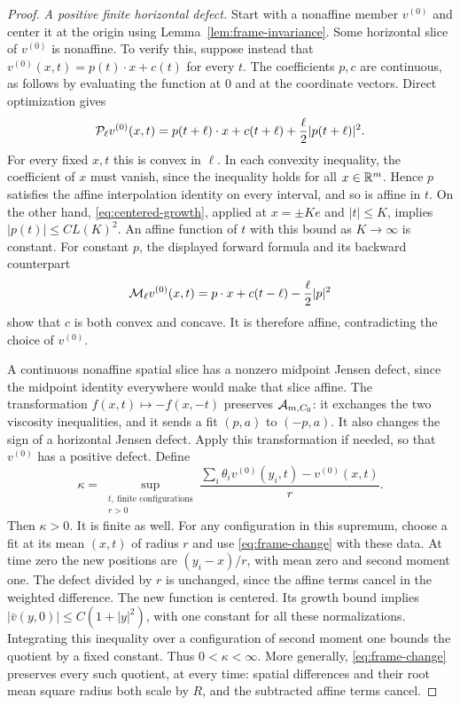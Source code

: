 \begin{proof}
\emph{A positive finite horizontal defect.}
Start with a nonaffine member $v^{(0)}$ and center it at the
origin using Lemma~\ref{lem:frame-invariance}. Some horizontal
slice of $v^{(0)}$ is nonaffine. To verify this, suppose instead
that
$v^{(0)}(x,t)=p(t)\cdot x+c(t)$ for every $t$. The coefficients
$p,c$ are continuous, as follows by evaluating the function at
$0$ and at the coordinate vectors. Direct optimization gives
\[
  \mathcal{P}_\ell v^{(0)}(x,t)
   =p(t+\ell)\cdot x+c(t+\ell)
                         +\frac{\ell}{2}|p(t+\ell)|^2.
\]
For every fixed $x,t$ this is convex in $\ell$. In each
convexity inequality, the coefficient of $x$ must vanish,
since the inequality holds for all $x\in\mathbb{R}^m$. Hence $p$
satisfies the affine interpolation identity on every interval,
and so is affine in $t$. On the other hand,
\eqref{eq:centered-growth}, applied at $x=\pm Ke$ and
$|t|\le K$, implies $|p(t)|\le C L(K)^2$. An affine function
of $t$ with this bound as $K\to\infty$ is constant. For
constant $p$, the displayed forward formula and its backward
counterpart
\[
  \mathcal{M}_\ell v^{(0)}(x,t)
   =p\cdot x+c(t-\ell)-\frac{\ell}{2}|p|^2
\]
show that $c$ is both convex and concave. It is therefore
affine, contradicting the choice of $v^{(0)}$.

A continuous nonaffine spatial slice has a nonzero midpoint
Jensen defect, since the midpoint identity everywhere would
make that slice affine. The transformation
$f(x,t)\mapsto-f(x,-t)$ preserves $\mathcal{A}_{m,C_0}$: it
exchanges the two viscosity inequalities, and it sends a fit
$(p,a)$ to $(-p,a)$. It also changes the sign of a horizontal
Jensen defect. Apply this transformation if needed, so that
$v^{(0)}$ has a positive defect. Define
\begin{equation}\label{eq:jensen-supremum}
  \kappa=\sup_{\substack{t,\ \text{finite configurations}\\r>0}}
     \frac{\sum_i\theta_i v^{(0)}(y_i,t)-v^{(0)}(x,t)}{r}.
\end{equation}
Then $\kappa>0$. It is finite as well. For any configuration in
this supremum, choose a fit at its mean $(x,t)$ of radius $r$
and use \eqref{eq:frame-change} with these data. At time zero
the new positions are $(y_i-x)/r$, with mean zero and second
moment one. The defect divided by $r$ is unchanged, since the
affine terms cancel in the weighted difference. The new
function is centered. Its growth bound implies
$|\bar v(y,0)|\le C(1+|y|^2)$, with one constant for all these
normalizations. Integrating this inequality over a
configuration of second moment one bounds the quotient by a
fixed constant. Thus $0<\kappa<\infty$. More generally,
\eqref{eq:frame-change} preserves every such quotient, at
every time: spatial differences and their root mean square
radius both scale by $R$, and the subtracted affine terms
cancel.


\end{proof}
